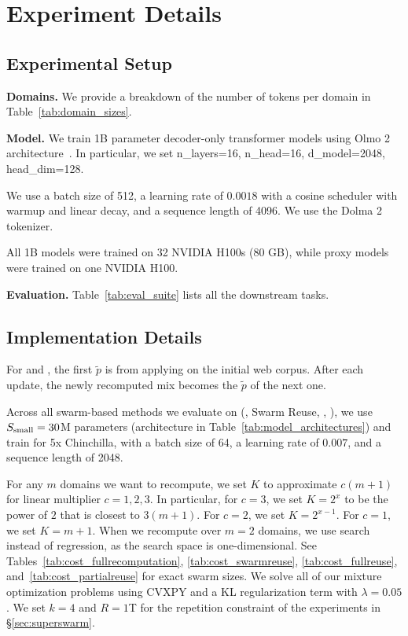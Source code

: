 \section{Experiment Details}\label{supp:details}


\subsection{Experimental Setup}\label{supp:exp_details}

\textbf{Domains.} We provide a breakdown of the number of tokens per domain in Table~\ref{tab:domain_sizes}.






\textbf{Model.} We train 1B parameter decoder-only transformer models using Olmo 2 architecture~\citep{olmo20242olmo2furious}. In particular, we set n\_layers=16, n\_head=16, d\_model=2048, head\_dim=128.

We use a batch size of 512, a learning rate of $0.0018$ with a cosine scheduler with warmup and linear decay, and a sequence length of 4096. We use the Dolma 2 tokenizer.

All 1B models were trained on 32 NVIDIA H100s (80 GB), while proxy models were trained on one NVIDIA H100. 


\textbf{Evaluation.} Table~\ref{tab:eval_suite} lists all the downstream tasks. 





\subsection{Implementation Details}\label{supp:imp_details}

For \fullmixreuse and \partialmixreuse, the first $\tilde{p}$ is from applying \base on the initial web corpus. After each update, the newly recomputed mix becomes the $\tilde{p}$ of the next one.


Across all swarm-based methods we evaluate on (\base, Swarm Reuse, \fullmixreuse, \partialmixreuse), we use $S_{\text{small}}=30$M parameters (architecture in Table~\ref{tab:model_architectures}) and train for 5x Chinchilla, with a batch size of 64, a learning rate of $0.007$, and a sequence length of 2048. 

For any $m$ domains we want to recompute, we set $K$ to approximate $c(m + 1)$ for linear multiplier $c = 1, 2, 3$. In particular, for $c = 3$, we set $K = 2^x$ to be the power of $2$ that is closest to $3(m+1)$. For $c = 2$, we set $K = 2^{x-1}$. For $c = 1$, we set $K = m+1$. When we recompute over $m=2$ domains, we use search instead of regression, as the search space is one-dimensional. See Tables~\ref{tab:cost_fullrecomputation}, \ref{tab:cost_swarmreuse}, \ref{tab:cost_fullreuse}, and~\ref{tab:cost_partialreuse} for exact swarm sizes.
We solve all of our mixture optimization problems using CVXPY and a KL regularization term with $\lambda=0.05$. We set $k=4$ and $R = 1$T for the repetition constraint of the experiments in \S\ref{sec:superswarm}. 


